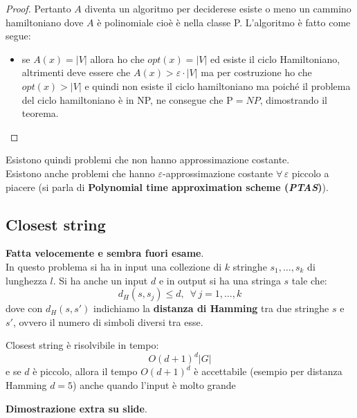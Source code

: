 \begin{proof}
																      		Pertanto $A$ diventa un algoritmo per deciderese esiste o meno un
																      		cammino hamiltoniano dove $A$ è polinomiale cioè è nella classe
																      		P. L’algoritmo è fatto come segue:
																      		\begin{itemize}
																      			\item se $A(x)=|V|$ allora ho che $opt(x)=|V|$ ed esiste il ciclo
																      			      Hamiltoniano, altrimenti deve essere che $A(x)>\varepsilon\cdot |V|$ ma per
																      			      costruzione ho che $opt(x)>|V|$ e quindi non esiste il ciclo hamiltoniano ma
																      			      poiché il problema del ciclo hamiltoniano è in NP, ne consegue che P$=NP$,
																      			      dimostrando il teorema.
																      		\end{itemize}
																      	\end{proof}
																      	Esistono quindi problemi che non hanno approssimazione costante.\\
																      	Esistono anche problemi che hanno $\varepsilon$-approssimazione costante
																      	$\forall\,\varepsilon$ piccolo a piacere (si parla di \textbf{Polynomial time
																      		approximation scheme (\textit{PTAS})}). 
																      	\subsection{Closest string}
																      	\textbf{Fatta velocemente e sembra fuori esame}.\\
																      	In questo problema si ha in input una collezione di $k$ stringhe
																      	$s_1,\ldots,s_k$ di lunghezza $l$. Si ha anche un input $d$ e in output si ha
																      	una stringa $s$ tale che:
																      	\[d_H(s,s_j)\leq d,\,\,\,\forall\,j= 1,\ldots,k\]
																      	dove con $d_H(s,s')$ indichiamo la \textbf{distanza di Hamming} tra due stringhe
																      	$s$ e $s'$, ovvero il numero di simboli diversi tra esse.
																      	\begin{teorema}
																      		Closest string è risolvibile in tempo:
																      		\[O(d+1)^d|G|\]
																      		e se $d$ è piccolo, allora il tempo $O(d+1)^d$ è accettabile (esempio per
																      		distanza Hamming $d = 5$) anche quando l’input è molto grande  
																      	\end{teorema}
																      	\textbf{Dimostrazione extra su slide}.